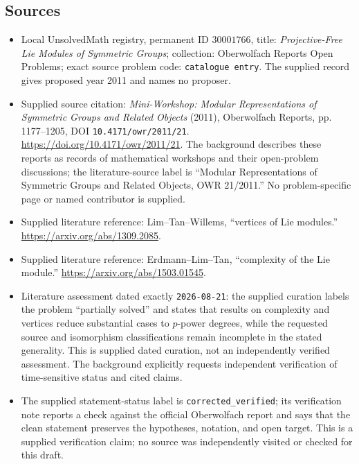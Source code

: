 \documentclass[11pt]{article}
\begin{document}
\subsection{Sources}
\begin{itemize}
\item Local UnsolvedMath registry, permanent ID \(30001766\), title: \emph{Projective-Free Lie Modules of Symmetric Groups}; collection: Oberwolfach Reports Open Problems; exact source problem code: \texttt{catalogue entry}. The supplied record gives proposed year 2011 and names no proposer.
\item Supplied source citation: \emph{Mini-Workshop: Modular Representations of Symmetric Groups and Related Objects} (2011), Oberwolfach Reports, pp. 1177--1205, DOI \texttt{10.4171/owr/2011/21}. \url{https://doi.org/10.4171/owr/2011/21}. The background describes these reports as records of mathematical workshops and their open-problem discussions; the literature-source label is ``Modular Representations of Symmetric Groups and Related Objects, OWR 21/2011.'' No problem-specific page or named contributor is supplied.
\item Supplied literature reference: Lim--Tan--Willems, ``vertices of Lie modules.'' \url{https://arxiv.org/abs/1309.2085}.
\item Supplied literature reference: Erdmann--Lim--Tan, ``complexity of the Lie module.'' \url{https://arxiv.org/abs/1503.01545}.
\item Literature assessment dated exactly \texttt{2026-08-21}: the supplied curation labels the problem ``partially solved'' and states that results on complexity and vertices reduce substantial cases to \(p\)-power degrees, while the requested source and isomorphism classifications remain incomplete in the stated generality. This is supplied dated curation, not an independently verified assessment. The background explicitly requests independent verification of time-sensitive status and cited claims.
\item The supplied statement-status label is \texttt{corrected\_verified}; its verification note reports a check against the official Oberwolfach report and says that the clean statement preserves the hypotheses, notation, and open target. This is a supplied verification claim; no source was independently visited or checked for this draft.
\end{itemize}
\end{document}
